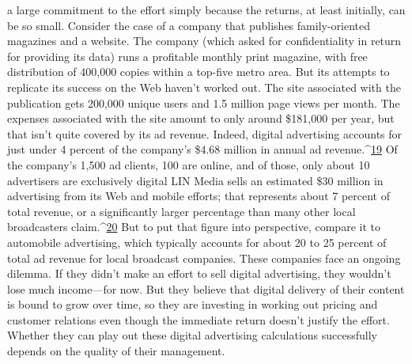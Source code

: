a large commitment to the effort simply because the returns, at least initially,
can be so small. Consider the case of a company that publishes family-oriented
magazines and a website. The company (which asked for confidentiality in return
for providing its data) runs a profitable monthly print magazine, with free
distribution of 400,000 copies within a top-five metro area. But its attempts to
replicate its success on the Web haven't worked out. The site associated with the
publication gets 200,000 unique users and 1.5 million page views per month.
The expenses associated with the site amount to only around \$181,000 per year,
but that isn't quite covered by its ad revenue. Indeed, digital advertising accounts
for just under 4 percent of the company's \$4.68 million in annual ad revenue.^{\href{#endnotes-chapter-9}{19}}
Of the company's 1,500 ad clients, 100 are online, and of those, only about 10
advertisers are exclusively digital
LIN Media sells an estimated \$30 million in advertising from its Web and mobile
efforts; that represents about 7 percent of total revenue, or a significantly larger
percentage than many other local broadcasters claim.^{\href{#endnotes-chapter-9}{20}} But to put that figure
into perspective, compare it to automobile advertising, which typically accounts
for about 20 to 25 percent of total ad revenue for local broadcast companies.
These companies face an ongoing dilemma. If they didn't make an effort to
sell digital advertising, they wouldn't lose much income—for now. But they believe
that digital delivery of their content is bound to grow over time, so they
are investing in working out pricing and customer relations even though the immediate
return doesn't justify the effort. Whether they can play out these digital
advertising calculations successfully depends on the quality of their management.

